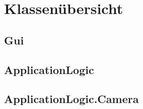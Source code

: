 \section{Klassenübersicht}

\subsection{Gui}

\newpage


\newpage


\newpage


\newpage


\newpage


\newpage


\newpage

\subsection{ApplicationLogic}

\newpage


\newpage


\newpage


\newpage


\newpage


\newpage

\subsection{ApplicationLogic.Camera}

\newpage


\newpage


\newpage


\newpage